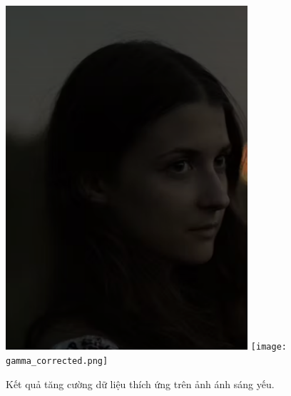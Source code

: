 \documentclass[a4paper,12pt]{article}
\begin{document}
\begin{figure}[h]
    \centering
    \includegraphics[width=0.8\textwidth]{dark_image.png}
    \texttt{[image: gamma\_corrected.png]}
    \caption{Kết quả tăng cường dữ liệu thích ứng trên ảnh ánh sáng yếu.}
\end{figure}
\end{document}

